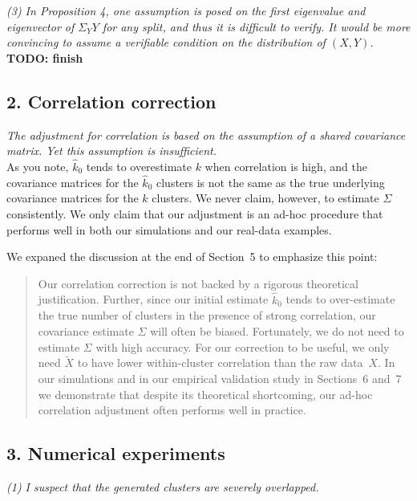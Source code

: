 \documentclass[11pt]{article}
\begin{document}
\noindent
\emph{(3) In Proposition 4, one assumption is posed on the first eigenvalue
and eigenvector of $\Sigma_YY$ for any split, and thus it is difficult to
verify. It would be more convincing to assume a verifiable condition on the
distribution of $(X, Y)$.}
\\

\textbf{TODO: finish}


\subsection{2. Correlation correction}

\emph{The adjustment for correlation is based on the assumption of a
shared covariance matrix. Yet this assumption is insufficient.}
\\

As you note, $\hat{k}_0$ tends to overestimate $k$ when correlation is high,
and the covariance matrices for the  $\hat{k}_0$ clusters is not the same as
the true underlying covariance matrices for the $k$ clusters. We never claim,
however, to estimate $\Sigma$ consistently. We only claim that our adjustment
is an ad-hoc procedure that performs well in both our simulations and our
real-data examples.

We expaned the discussion at the end of Section~5 to emphasize this point:

\begin{quote}
Our correlation correction is not backed by a rigorous theoretical
justification. Further, since our initial estimate $\hat k_0$ tends to
over-estimate the true number of clusters in the presence of strong
correlation, our covariance estimate $\hat \Sigma$ will often be biased.
Fortunately, we do not need to estimate $\Sigma$ with high accuracy. For our
correction to be useful, we only need $\tilde{X}$ to have lower within-cluster
correlation than the raw data~$X$. In our simulations and in our empirical
validation study in Sections~6 and~7 we demonstrate that despite its
theoretical shortcoming, our ad-hoc correlation adjustment often performs well
in practice.
\end{quote}


\subsection{3. Numerical experiments}

\noindent
\emph{(1) I suspect that the generated clusters are severely overlapped.}
\\
\end{document}
